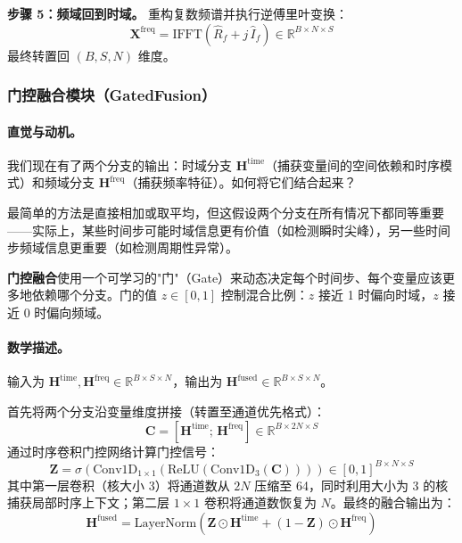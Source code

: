 \documentclass[UTF8]{ctexart}
\begin{document}
\textbf{步骤 5：频域回到时域。} 重构复数频谱并执行逆傅里叶变换：
\begin{equation}
    \mathbf{X}^{\text{freq}} = \mathrm{IFFT}\!\left(\hat{R}_f + j \, \hat{I}_f\right) \in \mathbb{R}^{B \times N \times S}
\end{equation}
最终转置回 $(B, S, N)$ 维度。

\subsubsection{门控融合模块（GatedFusion）}

\paragraph{直觉与动机。}

我们现在有了两个分支的输出：时域分支 $\mathbf{H}^{\text{time}}$（捕获变量间的空间依赖和时序模式）和频域分支 $\mathbf{H}^{\text{freq}}$（捕获频率特征）。如何将它们结合起来？

最简单的方法是直接相加或取平均，但这假设两个分支在所有情况下都同等重要——实际上，某些时间步可能时域信息更有价值（如检测瞬时尖峰），另一些时间步频域信息更重要（如检测周期性异常）。

\textbf{门控融合}使用一个可学习的"门"（Gate）来动态决定每个时间步、每个变量应该更多地依赖哪个分支。门的值 $z \in [0,1]$ 控制混合比例：$z$ 接近 1 时偏向时域，$z$ 接近 0 时偏向频域。

\paragraph{数学描述。}

输入为 $\mathbf{H}^{\text{time}}, \mathbf{H}^{\text{freq}} \in \mathbb{R}^{B \times S \times N}$，输出为 $\mathbf{H}^{\text{fused}} \in \mathbb{R}^{B \times S \times N}$。

首先将两个分支沿变量维度拼接（转置至通道优先格式）：
\begin{equation}
    \mathbf{C} = [\mathbf{H}^{\text{time}}; \, \mathbf{H}^{\text{freq}}] \in \mathbb{R}^{B \times 2N \times S}
\end{equation}
通过时序卷积门控网络计算门控信号：
\begin{equation}
    \mathbf{Z} = \sigma\!\left(\mathrm{Conv1D}_{1 \times 1}\!\left(\mathrm{ReLU}\!\left(\mathrm{Conv1D}_{3}\!\left(\mathbf{C}\right)\right)\right)\right) \in [0,1]^{B \times N \times S}
\end{equation}
其中第一层卷积（核大小 3）将通道数从 $2N$ 压缩至 64，同时利用大小为 3 的核捕获局部时序上下文；第二层 $1\times 1$ 卷积将通道数恢复为 $N$。最终的融合输出为：
\begin{equation}
    \mathbf{H}^{\text{fused}} = \mathrm{LayerNorm}\!\left(\mathbf{Z} \odot \mathbf{H}^{\text{time}} + (1 - \mathbf{Z}) \odot \mathbf{H}^{\text{freq}}\right)
\end{equation}
\end{document}
